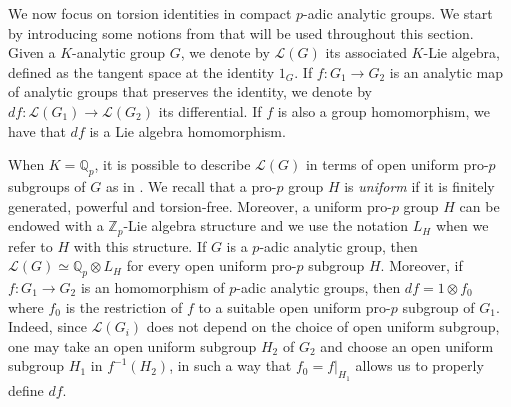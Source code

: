 \documentclass[a4paper,10pt]{amsart}
\theoremstyle{plain}
\theoremstyle{definition}
\newcommand{\bbQ}{\mathbb{Q}}
\newcommand{\bbZ}{\mathbb{Z}}
\numberwithin{equation}{section}
\begin{document}
We now focus on torsion identities in compact $p$-adic analytic groups. We start by introducing some notions from \cite{Ser65} that will be used throughout this section. Given a $K$-analytic group $G$, we denote by $\mathcal{L}(G)$ its associated $K$-Lie algebra, defined as the tangent space at the identity $1_G$. If $f\colon G_1\to G_2$ is an analytic map of analytic groups that preserves the identity, we denote by $df\colon\mathcal{L}(G_1)\to\mathcal{L}(G_2)$ its differential. If $f$ is also a group homomorphism, we have that $df$ is a Lie algebra homomorphism. 

When $K=\bbQ_p$, it is possible to describe $\mathcal{L}(G)$ in terms of open uniform pro-$p$ subgroups of $G$ as in \cite[Ch.~9]{DDMS}. We recall that a pro-$p$ group $H$ is \emph{uniform} if it is finitely generated, powerful and torsion-free. Moreover, a uniform pro-$p$ group $H$ can be endowed with a $\bbZ_p$-Lie algebra structure and we use the notation $L_H$ when we refer to $H$ with this structure. If $G$ is a $p$-adic analytic group, then $\mathcal{L}(G)\simeq \bbQ_p\otimes L_H$ for every open uniform pro-$p$ subgroup $H$. Moreover, if $f\colon G_1\to G_2$ is an homomorphism of $p$-adic analytic groups, then $df=1\otimes f_0$ where $f_0$ is the restriction of $f$ to a suitable open uniform pro-$p$ subgroup of $G_1$. Indeed, since $\mathcal L(G_i)$ does not depend on the choice of open uniform subgroup, one may take an open uniform subgroup $H_2$ of $G_2$ and choose an open uniform subgroup $H_1$ in $f^{-1}(H_2)$, in such a way that $f_0 = f|_{H_1}$ allows us to properly define $df$.
\end{document}
